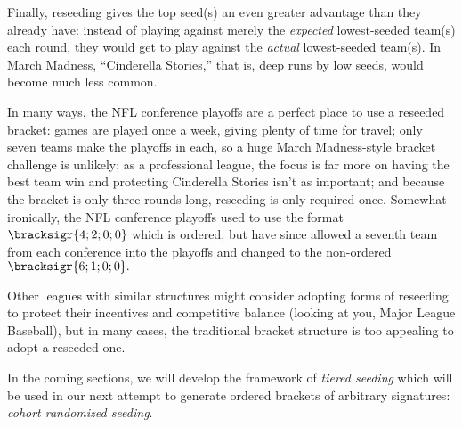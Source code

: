 {Finally, reseeding gives the top seed(s) an even greater advantage than they already have: instead of playing against merely the \textit{expected} lowest-seeded team(s) each round, they would get to play against the \textit{actual} lowest-seeded team(s). In March Madness, ``Cinderella Stories,'' that is, deep runs by low seeds, would become much less common.

In many ways, the NFL conference playoffs are a perfect place to use a reseeded bracket: games are played once a week, giving plenty of time for travel; only seven teams make the playoffs in each, so a huge March Madness-style bracket challenge is unlikely; as a professional league, the focus is far more on having the best team win and protecting Cinderella Stories isn't as important; and because the bracket is only three rounds long, reseeding is only required once. Somewhat ironically, the NFL conference playoffs used to use the format $\bracksigr{4;2;0;0}$ which is ordered, but have since allowed a seventh team from each conference into the playoffs and changed to the non-ordered $\bracksigr{6;1;0;0}.$ 

Other leagues with similar structures might consider adopting forms of reseeding to protect their incentives and competitive balance (looking at you, Major League Baseball), but in many cases, the traditional bracket structure is too appealing to adopt a reseeded one.

In the coming sections, we will develop the framework of \textit{tiered seeding} which will be used in our next attempt to generate ordered brackets of arbitrary signatures: \textit{cohort randomized seeding}.
}
